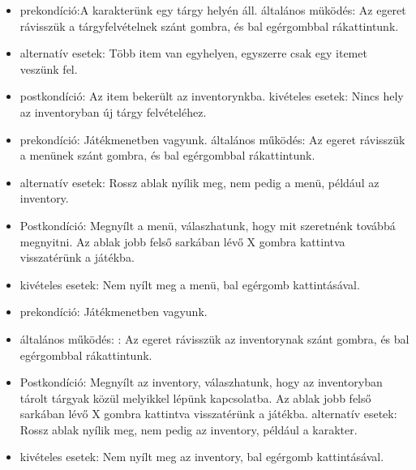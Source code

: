 



\begin{itemize}
    \item prekondíció:A karakterünk egy tárgy helyén áll.
    általános müködés: Az egeret rávisszük a tárgyfelvételnek szánt gombra, és bal egérgombbal rákattintunk.
    \item alternatív esetek: Több item van egyhelyen, egyszerre csak egy itemet veszünk fel.
    \item postkondíció: Az item bekerült az inventorynkba.
    kivételes esetek: Nincs hely az inventoryban új tárgy felvételéhez.
\end{itemize}


\begin{itemize}
    \item prekondíció: Játékmenetben vagyunk.
    általános működés: Az egeret rávisszük a menünek szánt gombra, és bal egérgombbal rákattintunk.
    \item alternatív esetek: Rossz ablak nyílik meg, nem pedig a menü, például az inventory.
    \item Postkondíció: Megnyílt a menü, válaszhatunk, hogy mit szeretnénk továbbá megnyitni. Az ablak jobb felső sarkában lévő X gombra kattintva visszatérünk a játékba.
    \item kivételes esetek: Nem nyílt meg a menü, bal egérgomb kattintásával.
\end{itemize}


\begin{itemize}
    \item prekondíció: Játékmenetben vagyunk.
    \item általános működés: : Az egeret rávisszük az inventorynak szánt gombra, és bal egérgombbal rákattintunk.
    \item Postkondíció: Megnyílt az inventory, válaszhatunk, hogy az inventoryban tárolt tárgyak közül melyikkel lépünk kapcsolatba. Az ablak jobb felső sarkában lévő X gombra kattintva visszatérünk a játékba.
    alternatív esetek: Rossz ablak nyílik meg, nem pedig az inventory, például a karakter.
    \item kivételes esetek: Nem nyílt meg az inventory, bal egérgomb kattintásával.
\end{itemize}

